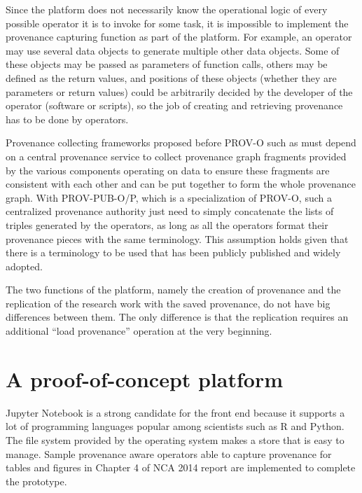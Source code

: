 Since the platform does not necessarily know the operational logic of every possible operator it is to invoke for some task, it is impossible to implement the provenance capturing function as part of the platform. For example, an operator may use several data objects to generate multiple other data objects. Some of these objects may be passed as parameters of function calls, others may be defined as the return values, and positions of these objects (whether they are parameters or return values) could be arbitrarily decided by the developer of the operator (software or scripts), so the job of creating and retrieving provenance has to be done by operators.

Provenance collecting frameworks proposed before PROV-O such as \cite{simmhan2006framework} must depend on a central provenance service to collect provenance graph fragments provided by the various components operating on data to ensure these fragments are consistent with each other and can be put together to form the whole provenance graph. With PROV-PUB-O/P, which is a specialization of PROV-O, such a centralized provenance authority just need to simply concatenate the lists of triples generated by the operators, as long as all the operators format their provenance pieces with the same terminology. This assumption holds given that there is a terminology to be used that has been publicly published and widely adopted.

The two functions of the platform, namely the creation of provenance and the replication of the research work with the saved provenance, do not have big differences between them. The only difference is that the replication requires an additional ``load provenance'' operation at the very beginning.





\section{A proof-of-concept platform}
Jupyter Notebook is a strong candidate for the front end because it supports a lot of programming languages popular among scientists such as R and Python.
The file system provided by the operating system makes a store that is easy to manage.
Sample provenance aware operators able to capture provenance for tables and figures in Chapter 4 of NCA 2014 report are implemented to complete the prototype.

